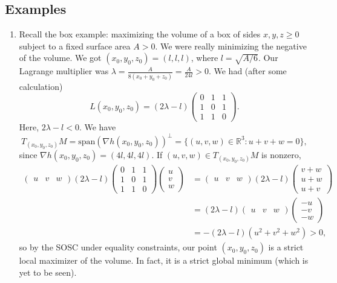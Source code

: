 \documentclass[11pt]{book}
\newcommand{\R}{\mathbb{R}}
\begin{document}
\subsection{Examples}

\begin{enumerate}
\item
Recall the box example: maximizing the volume of a box of sides $x,y,z\geq 0$ subject to a fixed surface area $A > 0$. We were really minimizing the negative of the volume. We got $(x_0,y_0,z_0) = (l,l,l)$, where $l = \sqrt{A/6}$. Our Lagrange multiplier was $\lambda = \frac{A}{8(x_0+y_0+z_0)} = \frac{A}{24 l} > 0$. We had (after some calculation)
\[
L(x_0,y_0,z_0) = (2\lambda - l)\begin{pmatrix}
0&1&1 \\
1&0&1 \\
1&1&0
\end{pmatrix}.
\]
Here, $2\lambda - l < 0$. We have 
\[
T_{(x_0,y_0,z_0)}M = \mathrm{span}( \nabla h(x_0,y_0,z_0) )^\perp = \{ (u,v,w) \in \R^3 : u+v+w=0 \},
\]
since $\nabla h(x_0,y_0,z_0) = (4l,4l,4l)$. If $(u,v,w) \in T_{(x_0,y_0,z_0)}M$ is nonzero,
\begin{align*}
\begin{pmatrix}
u&v&w
\end{pmatrix}(2\lambda - l)\begin{pmatrix}
0&1&1 \\
1&0&1 \\
1&1&0
\end{pmatrix} \begin{pmatrix}
u\\v\\w
\end{pmatrix} &= \begin{pmatrix}
u&v&w
\end{pmatrix}(2\lambda - l) \begin{pmatrix}
v+w \\ u+w \\ u+v
\end{pmatrix} \\
&= (2\lambda - l)\begin{pmatrix}
u&v&w
\end{pmatrix} \begin{pmatrix}
-u \\ -v \\ -w
\end{pmatrix} \\
&= -(2\lambda - l)(u^2+v^2+w^2) > 0,
\end{align*}
so by the SOSC under equality constraints, our point $(x_0,y_0,z_0)$ is a strict local maximizer of the volume. In fact, it is a strict global minimum (which is yet to be seen).


\end{enumerate}
\end{document}
